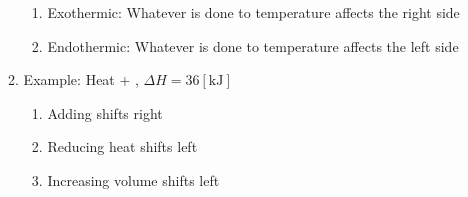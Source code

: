 \documentclass[12pt]{article}
\begin{document}
\begin{itemize}
\begin{enumerate}
\begin{enumerate}
          \item Exothermic: Whatever is done to temperature affects the right side

          \item Endothermic: Whatever is done to temperature affects the left side

        \end{enumerate}

      \item Example: Heat + , $\Delta H=36[\si{\kilo\joule}]$

        \begin{enumerate}

          \item Adding  shifts right

          \item Reducing heat shifts left

          \item Increasing volume shifts left

        \end{enumerate}

    \end{enumerate}

\end{itemize}
\end{document}
